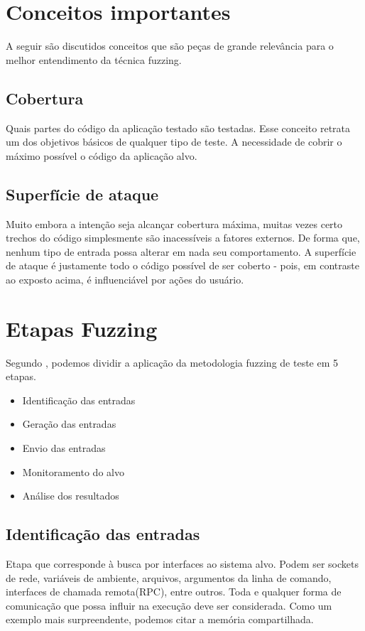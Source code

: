 	\section{Conceitos importantes}
		A seguir são discutidos conceitos que são peças de grande relevância para o melhor
		entendimento da técnica fuzzing.
		
		\subsection{Cobertura}
			Quais partes do código da aplicação testado são testadas.
			Esse conceito retrata um dos objetivos básicos de qualquer tipo de teste.
			A necessidade de cobrir o máximo possível o código da aplicação alvo.
		
		\subsection{Superfície de ataque}
			Muito embora a intenção seja alcançar cobertura máxima, muitas vezes
			certo trechos do código simplesmente são inacessíveis a fatores externos.
			De forma que, nenhum tipo de entrada possa alterar em nada seu comportamento.
			A superfície de ataque é justamente todo o código possível de ser coberto - pois,
			em contraste ao exposto acima, é influenciável por ações do usuário.
 
	\section{Etapas Fuzzing}
		Segundo \cite{Ari2008}, podemos dividir a aplicação da metodologia fuzzing
		de teste em 5 etapas.
		\begin{itemize}
			\item{Identificação das entradas}
			\item{Geração das entradas}
			\item{Envio das entradas}
			\item{Monitoramento do alvo}
			\item{Análise dos resultados}
		\end{itemize}
		\subsection{Identificação das entradas}
			Etapa que corresponde à busca por interfaces ao sistema alvo.
			Podem ser sockets de rede, variáveis de ambiente, arquivos, 
			argumentos da linha de comando, interfaces de chamada remota(RPC), entre outros.
			Toda e qualquer forma de comunicação que possa influir na execução deve ser considerada.
			Como um exemplo mais surpreendente, podemos citar a memória compartilhada.
